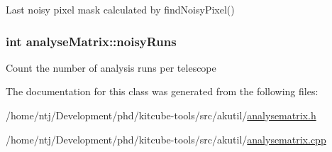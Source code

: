 Last noisy pixel mask calculated by find\-Noisy\-Pixel() \hypertarget{classanalyseMatrix_af4911f335c7415683cac99607ee3972d}{
\subsubsection[{noisy\-Runs}]{\setlength{\rightskip}{0pt plus 5cm}int analyse\-Matrix\-::noisy\-Runs}}\label{classanalyseMatrix_af4911f335c7415683cac99607ee3972d}
Count the number of analysis runs per telescope 

The documentation for this class was generated from the following files\-:\begin{DoxyCompactItemize}
\item 
/home/ntj/\-Development/phd/kitcube-\/tools/src/akutil/\hyperlink{analysematrix_8h}{analysematrix.\-h}\item 
/home/ntj/\-Development/phd/kitcube-\/tools/src/akutil/\hyperlink{analysematrix_8cpp}{analysematrix.\-cpp}\end{DoxyCompactItemize}
